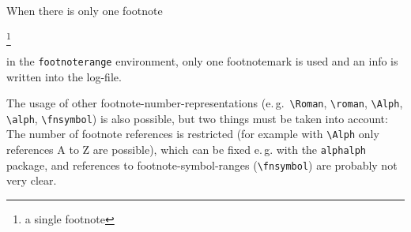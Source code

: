 \documentclass[british]{article}[2007/10/19]%
\begin{document}
\pagebreak

When there is only one footnote%
\begin{footnoterange}%
\footnote{a single footnote}%
\end{footnoterange}%
 in the \texttt{footnoterange} environment, only one
footnotemark is used and an info is written into the
log-file.\newline

The usage of other footnote-number-representations
(e.\,g.~\verb|\Roman|, \verb|\roman|, \verb|\Alph|, \verb|\alph|,
\verb|\fnsymbol|) is also possible, but two things must be taken
into account: The number of footnote references is restricted (for
example with \verb|\Alph| only references A to Z are possible), which
can be fixed e.\,g. with the \texttt{alphalph} package, and references
to footnote-symbol-ranges (\verb|\fnsymbol|) are probably
not very clear.
\end{document}
